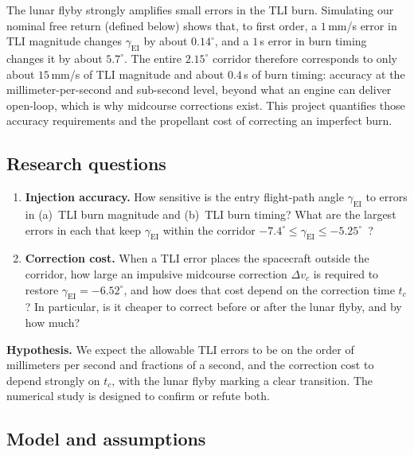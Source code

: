 \documentclass[11pt]{article}
\newcommand{\gEI}{\gamma_{\mathrm{EI}}}
\begin{document}
The lunar flyby strongly amplifies small errors in the TLI burn. Simulating our nominal free return (defined below) shows that, to first order, a $1$\,mm/s error in TLI magnitude changes $\gEI$ by about $0.14^\circ$, and a $1$\,s error in burn timing changes it by about $5.7^\circ$. The entire $2.15^\circ$ corridor therefore corresponds to only about $15$\,mm/s of TLI magnitude and about $0.4$\,s of burn timing: accuracy at the millimeter-per-second and sub-second level, beyond what an engine can deliver open-loop, which is why midcourse corrections exist. This project quantifies those accuracy requirements and the propellant cost of correcting an imperfect burn.

\subsection{Research questions}

\begin{enumerate}[label=\textbf{Q\arabic*.}, leftmargin=2.5em]
  \item \textbf{Injection accuracy.} How sensitive is the entry flight-path angle $\gEI$ to errors in (a)~TLI burn magnitude and (b)~TLI burn timing? What are the largest errors in each that keep $\gEI$ within the corridor $-7.4^\circ \le \gEI \le -5.25^\circ$~\cite{afj_day5}?
  \item \textbf{Correction cost.} When a TLI error places the spacecraft outside the corridor, how large an impulsive midcourse correction $\Delta v_c$ is required to restore $\gEI = -6.52^\circ$, and how does that cost depend on the correction time $t_c$? In particular, is it cheaper to correct before or after the lunar flyby, and by how much?
\end{enumerate}

\noindent\textbf{Hypothesis.} We expect the allowable TLI errors to be on the order of millimeters per second and fractions of a second, and the correction cost to depend strongly on $t_c$, with the lunar flyby marking a clear transition. The numerical study is designed to confirm or refute both.

\subsection{Model and assumptions}
\end{document}
